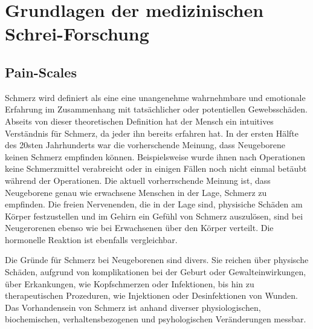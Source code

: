 \chapter{Grundlagen der medizinischen Schrei-Forschung}

\section{Pain-Scales}
\label{sec:painScores}

Schmerz wird definiert als eine \glqq eine unangenehme wahrnehmbare und emotionale Erfahrung im Zusammenhang mit tatsächlicher oder potentiellen Gewebsschäden\grqq{}. Abseits von dieser theoretischen Definition hat der Mensch ein intuitives Verständnis für Schmerz, da jeder ihn bereits erfahren hat. In der ersten Hälfte des 20sten Jahrhunderts war die vorherschende Meinung, dass Neugeborene keinen Schmerz empfinden können. Beispielsweise wurde ihnen nach Operationen keine Schmerzmittel verabreicht oder in einigen Fällen noch nicht einmal betäubt während der Operationen. Die aktuell vorherrschende Meinung ist, dass Neugeborene genau wie erwachsene Menschen in der Lage, Schmerz zu empfinden. Die freien Nervenenden, die in der Lage sind, physisiche Schäden am Körper festzustellen und im Gehirn ein Gefühl von Schmerz auszulösen, sind bei Neugerorenen ebenso wie bei Erwachsenen über den Körper verteilt. Die hormonelle Reaktion ist ebenfalls vergleichbar. \cite[S. 402]{PainAssessment03} \cite[S. 438]{PainAssessment01}

Die Gründe für Schmerz bei Neugeborenen sind divers. Sie reichen über physische Schäden, aufgrund von komplikationen bei der Geburt oder Gewalteinwirkungen, über Erkankungen, wie Kopfschmerzen oder Infektionen, bis hin zu therapeutischen Prozeduren, wie Injektionen oder Desinfektionen von Wunden.  Das Vorhandensein von Schmerz ist anhand diverser physiologischen, biochemischen, verhaltensbezogenen und psyhologischen Veränderungen messbar.\cite[S. 441]{PainAssessment01}

